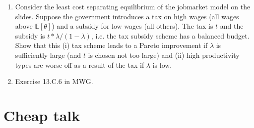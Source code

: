 \documentclass[a4paper,12pt]{article}
\begin{document}
\begin{enumerate}
\item Consider the least cost separating equilibrium of the jobmarket model on the slides. Suppose the government introduces a tax on high wages (all wages above $\mathbb{E}[\theta ]$) and a subsidy for low wages (all others). The tax is $t$ and the subsidy is $t*\lambda/(1-\lambda)$, i.e. the tax subsidy scheme has a balanced budget. Show that this (i) tax scheme leads to a Pareto improvement if $\lambda$ is sufficiently large (and $t$ is chosen not too large) and (ii) high productivity types are worse off as a result of the tax if $\lambda$ is low. 
\item Exercise 13.C.6 in MWG.
\end{enumerate}

\section{Cheap talk}
\label{sec:cheap-talk}
\end{document}
